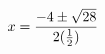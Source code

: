 \documentclass[preview]{standalone}
\begin{document}
\begin{align*}
\special{dvisvgm:raw <g id='unique000'>}x=\frac{-4\pm\sqrt{28}}{2(\frac{1}{2})}\special{dvisvgm:raw </g>}
\end{align*}
\end{document}
